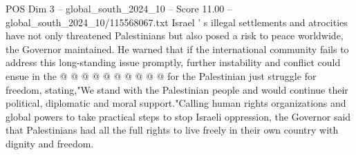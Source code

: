 \begin{textsample}{POS Dim 3 – global\_south\_2024\_10 – Score 11.00 – global\_south\_2024\_10/115568067.txt}
Israel ' s illegal settlements and atrocities have not only threatened Palestinians but also posed a risk to peace worldwide, the Governor maintained.
He warned that if the international community fails to address this long-standing issue promptly, further instability and conflict could ensue in the @ @ @ @ @ @ @ @ @ @ for the Palestinian just struggle for freedom, stating,"We stand with the Palestinian people and would continue their political, diplomatic and moral support."Calling human rights organizations and global powers to take practical steps to stop Israeli oppression, the Governor said that Palestinians had all the full rights to live freely in their own country with dignity and freedom.

\end{textsample}
